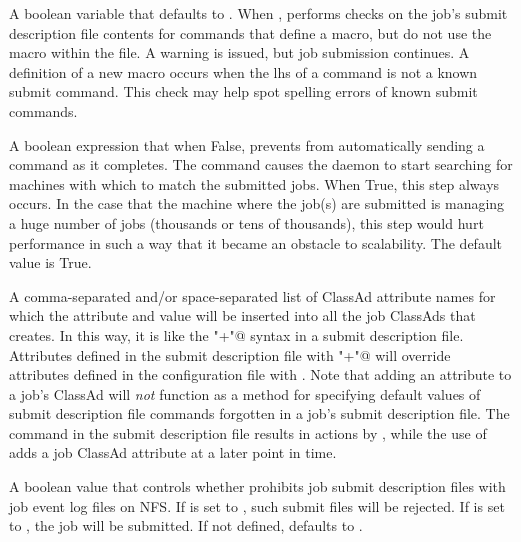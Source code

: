 \begin{description}
\label{param:WarnOnUnusedSubmitFileMacros}
\item[\Macro{WARN\_ON\_UNUSED\_SUBMIT\_FILE\_MACROS}]
  A boolean variable that defaults to .
  When , 
  performs checks on the job's submit description file contents
  for commands that define a macro, but do not use the macro within
  the file.
  A warning is issued, but job submission continues.
  A definition of a new macro occurs when the lhs of a command is not
  a known submit command.  This check may help spot spelling errors
  of known submit commands.

\label{param:SubmitSendReschedule}
\item[\Macro{SUBMIT\_SEND\_RESCHEDULE}]
  A boolean expression that when False, prevents  from
  automatically sending a  command as it completes.
  The  command causes the  daemon
  to start searching for machines with which to match the submitted
  jobs.  When True, this step always occurs.
  In the case that the machine where the job(s) are submitted is
  managing a huge number of jobs (thousands or tens of thousands),
  this step would hurt performance in such a way that it became
  an obstacle to scalability.
  The default value is True.

\label{param:SubmitExprs}
\item[\Macro{SUBMIT\_EXPRS}]
  A comma-separated and/or space-separated 
  list of ClassAd attribute names for which the attribute and value will
  be inserted into all the job ClassAds that  creates.  
  In this way,
  it is like the \verb@"+"@ syntax in a submit description file.
  Attributes defined in the submit description file with \verb@"+"@ will
  override attributes defined in the configuration file with
  . 
  Note that adding an attribute to a job's ClassAd will \emph{not} function
  as a method for specifying default values of submit description file commands
  forgotten in a job's submit description file.
  The command in the submit description file results in actions by
  ,
  while the use of  adds a job ClassAd attribute
  at a later point in time.

\label{param:LogOnNfsIsError}
\item[\Macro{LOG\_ON\_NFS\_IS\_ERROR}]
  A boolean value that controls whether  prohibits
  job submit description files with job event log files on NFS.  If
   is set to , such
  submit files will be rejected.  If 
  is set to ,
  the job will be submitted.  If not defined,
   defaults to .


\end{description}
